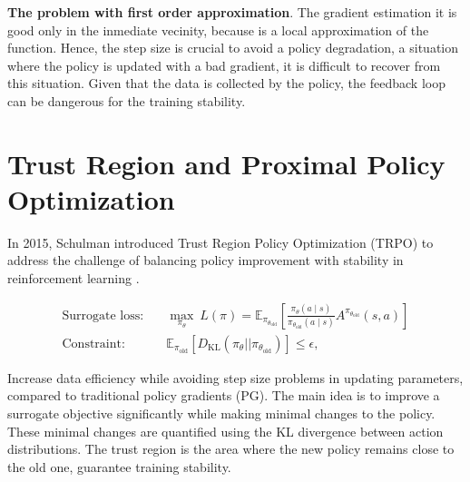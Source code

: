 \noindent \textbf{The problem with first order approximation}. The gradient estimation it is good only in the inmediate vecinity, because is a local approximation of the function. Hence, the step size is crucial to avoid a policy degradation, a situation where the policy is updated with a bad gradient,
it is difficult to recover from this situation. Given that the data is collected by the policy, the feedback loop can be dangerous for the training
stability. \\

\section{Trust Region and Proximal Policy Optimization}


In 2015, Schulman \cite{schulman2015trust} introduced Trust Region Policy Optimization (TRPO) to address the challenge of balancing policy improvement with stability in reinforcement learning . 

\begin{align}
    \text{Surrogate loss:} \quad & \underset{\pi_{\theta}}{\max}~L(\pi) = \mathbb{E}_{\pi_{\theta_{\text{old}}}} \left[ \frac{\pi_{\theta}(a\mid s)}{\pi_{\theta_{\text{old}}}(a\mid s)} A^{\pi_{\theta_{\text{old}}}}(s, a) \right] \label{eq:loss} \\
    \text{Constraint:} \quad & \mathbb{E}_{\pi_{\text{old}}} \left[ D_{\text{KL}}(\pi_{\theta} || \pi_{\theta_{\text{old}}}) \right]  \leq \epsilon, \nonumber
\end{align}


\noindent Increase data efficiency while avoiding step size problems in updating parameters, compared to traditional policy gradients (PG). The main idea is to improve a surrogate objective significantly while making minimal changes to the policy. These minimal changes are quantified using the KL divergence between action distributions. The trust region is the area where the new policy remains close to the old one, guarantee training stability. \\



